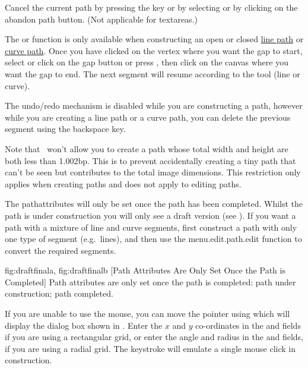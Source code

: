 Cancel the current \gls{path} by pressing the
 key or by selecting
 or by clicking on the abandon path button.
(Not applicable for \glspl{textarea}.)


The  or  function is only
available when constructing an open or closed
\hyperref[sec:newlinepath]{line path} or \hyperref[sec:newcurvepath]{curve
path}.  Once you have clicked on the vertex where you want the
\gls{gap} to start, select  or click on the
\gls{gap} button or press , then click
on the \gls{canvas} where you want the \gls{gap} to end. The next
segment will resume according to the tool (line or curve).

\begin{warning}
The undo/redo mechanism is disabled while you are constructing a
path, however while you are creating a line path or a curve path,
you can delete the previous segment using the
backspace  key.
\end{warning}

Note that \FlowframTk\ won't allow you to create a \gls{path} whose
total width and height are both less than 1.002\gls{bp}. This is to
prevent accidentally creating a tiny path that can't be seen but
contributes to the total image dimensions. This restriction only
applies when creating \glspl*{path} and does not apply to editing
paths.

The \gls{pathattributes} will only be set
once the \gls{path} has been completed. Whilst the
\gls{path} is under construction you will
only see a draft version (see ).
If you want a \gls{path} with a mixture of line and curve
segments, first construct a \gls{path} with only one
type of segment (e.g.\ lines), and then use the
\gls{menu.edit.path.edit} function to convert
the required segments.

{
 {fig:draftfinala}{}{},
 {fig:draftfinalb}{}{}
}
[Path Attributes Are Only Set Once the Path is Completed]
{Path attributes are only set once the path is completed:
 path under construction;
 path completed.}

%
If you are unable to use the mouse, you can move the pointer using
 which will display the dialog box shown in
. Enter the $x$ and $y$ co-ordinates in the
 and  fields if you are
using a rectangular grid, or enter the angle and radius in the
 and  fields,
if you are using a radial grid. The keystroke
 will emulate a single mouse
click in \gls{construction}.

